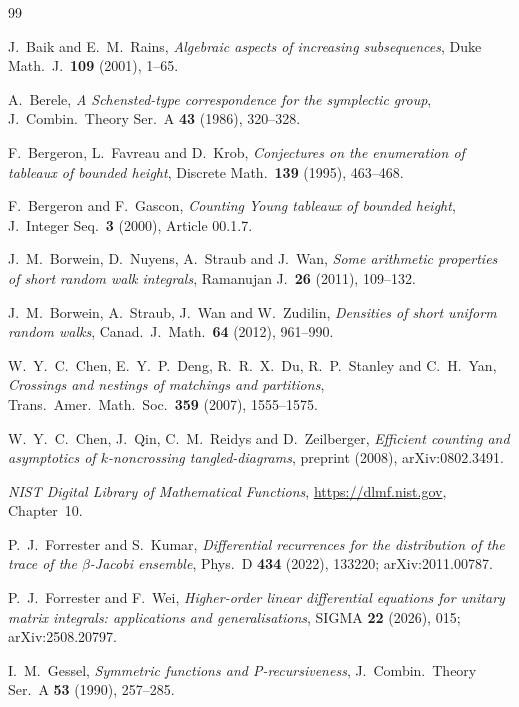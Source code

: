 \documentclass[11pt,a4paper]{article}
\theoremstyle{definition}
\theoremstyle{remark}
\numberwithin{equation}{section}
\begin{document}
\clearpage{}
{}
\begin{thebibliography}{99}
\raggedright
{}
J.~Baik and E.~M.~Rains, \emph{Algebraic aspects of increasing subsequences}, Duke Math.\ J.\ \textbf{109} (2001), 1--65.

A.~Berele, \emph{A Schensted-type correspondence for the symplectic group}, J.\ Combin.\ Theory Ser.\ A \textbf{43} (1986), 320--328.

F.~Bergeron, L.~Favreau and D.~Krob, \emph{Conjectures on the enumeration of tableaux of bounded height}, Discrete Math.\ \textbf{139} (1995), 463--468.

F.~Bergeron and F.~Gascon, \emph{Counting Young tableaux of bounded height}, J.\ Integer Seq.\ \textbf{3} (2000), Article 00.1.7.

J.~M.~Borwein, D.~Nuyens, A.~Straub and J.~Wan, \emph{Some arithmetic properties of short random walk integrals}, Ramanujan J.\ \textbf{26} (2011), 109--132.

J.~M.~Borwein, A.~Straub, J.~Wan and W.~Zudilin, \emph{Densities of short uniform random walks}, Canad.\ J.\ Math.\ \textbf{64} (2012), 961--990.

W.~Y.~C.~Chen, E.~Y.~P.~Deng, R.~R.~X.~Du, R.~P.~Stanley and C.~H.~Yan, \emph{Crossings and nestings of matchings and partitions}, Trans.\ Amer.\ Math.\ Soc.\ \textbf{359} (2007), 1555--1575.

W.~Y.~C.~Chen, J.~Qin, C.~M.~Reidys and D.~Zeilberger, \emph{Efficient counting and asymptotics of $k$-noncrossing tangled-diagrams}, preprint (2008), arXiv:0802.3491.

\emph{NIST Digital Library of Mathematical Functions}, \url{https://dlmf.nist.gov}, Chapter~10.

P.~J.~Forrester and S.~Kumar, \emph{Differential recurrences for the distribution of the trace of the $\beta$-Jacobi ensemble}, Phys.\ D \textbf{434} (2022), 133220; arXiv:2011.00787.

P.~J.~Forrester and F.~Wei, \emph{Higher-order linear differential equations for unitary matrix integrals: applications and generalisations}, SIGMA \textbf{22} (2026), 015; arXiv:2508.20797.

I.~M.~Gessel, \emph{Symmetric functions and P-recursiveness}, J.\ Combin.\ Theory Ser.\ A \textbf{53} (1990), 257--285.


\end{thebibliography}
\end{document}

